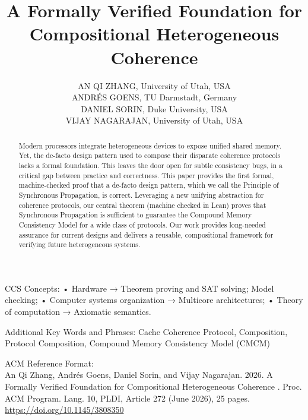 \documentclass[10pt]{article}
\title{A Formally Verified Foundation for Compositional Heterogeneous Coherence }
\author{AN QI ZHANG, University of Utah, USA\\
ANDRÉS GOENS, TU Darmstadt, Germany\\
DANIEL SORIN, Duke University, USA\\
VIJAY NAGARAJAN, University of Utah, USA}
\date{}
\begin{document}
\maketitle
\captionsetup{singlelinecheck=false}


\begin{abstract}
Modern processors integrate heterogeneous devices to expose unified shared memory. Yet, the de-facto design pattern used to compose their disparate coherence protocols lacks a formal foundation. This leaves the door open for subtle consistency bugs, in a critical gap between practice and correctness. This paper provides the first formal, machine-checked proof that a de-facto design pattern, which we call the Principle of Synchronous Propagation, is correct. Leveraging a new unifying abstraction for coherence protocols, our central theorem (machine checked in Lean) proves that Synchronous Propagation is sufficient to guarantee the Compound Memory Consistency Model for a wide class of protocols. Our work provides long-needed assurance for current designs and delivers a reusable, compositional framework for verifying future heterogeneous systems.
\end{abstract}

CCS Concepts: • Hardware → Theorem proving and SAT solving; Model checking; • Computer systems organization → Multicore architectures; • Theory of computation → Axiomatic semantics.

Additional Key Words and Phrases: Cache Coherence Protocol, Composition, Protocol Composition, Compound Memory Consistency Model (CMCM)

ACM Reference Format:\\
An Qi Zhang, Andrés Goens, Daniel Sorin, and Vijay Nagarajan. 2026. A Formally Verified Foundation for Compositional Heterogeneous Coherence . Proc. ACM Program. Lang. 10, PLDI, Article 272 (June 2026), 25 pages.\\
\href{https://doi.org/10.1145/3808350}{https://doi.org/10.1145/3808350}
\end{document}
